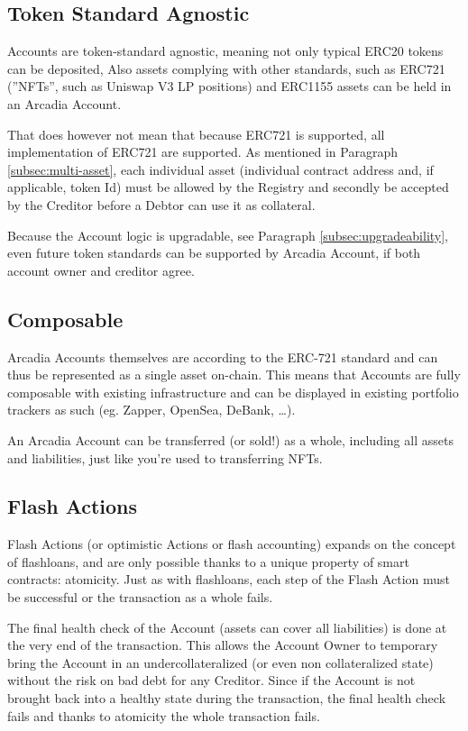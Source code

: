 \documentclass[sigconf,nonacm]{acmart}
\begin{document}
\subsection{Token Standard Agnostic}
Accounts are token-standard agnostic, meaning not only typical ERC20 tokens can be deposited,
Also assets complying with other standards, such as ERC721 (”NFTs”, such as Uniswap V3 LP positions) and ERC1155 assets can be held in an Arcadia Account.

That does however not mean that because ERC721 is supported, all implementation of ERC721 are supported.
As mentioned in Paragraph \ref{subsec:multi-asset}, each individual asset (individual contract address and, if applicable, token Id)
must be allowed by the Registry and secondly be accepted by the Creditor before a Debtor can use it as collateral.

Because the Account logic is upgradable, see Paragraph \ref{subsec:upgradeability}, even future token standards can be supported by Arcadia Account,
if both account owner and creditor agree.

\subsection{Composable}
Arcadia Accounts themselves are according to the ERC-721 standard and can thus be represented as a single asset on-chain.
This means that Accounts are fully composable with existing infrastructure and can be displayed in existing portfolio trackers as such (eg. Zapper, OpenSea, DeBank, …).

An Arcadia Account can be transferred (or sold!) as a whole, including all assets and liabilities, just like you're used to transferring NFTs.

\subsection{Flash Actions}
Flash Actions (or optimistic Actions or flash accounting) expands on the concept of flashloans, and are only possible thanks to a unique property of smart contracts: atomicity\cite{xie2022towards}.
Just as with flashloans, each step of the Flash Action must be successful or the transaction as a whole fails.

The final health check of the Account (assets can cover all liabilities) is done at the very end of the transaction.
This allows the Account Owner to temporary bring the Account in an undercollateralized (or even non collateralized state) without the risk on bad debt for any Creditor.
Since if the Account is not brought back into a healthy state during the transaction, the final health check fails and thanks to atomicity the whole transaction fails.
\end{document}
